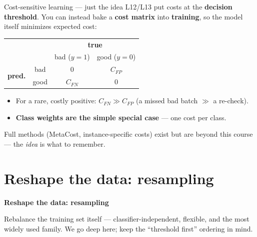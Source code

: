 \documentclass[aspectratio=169]{beamer}
\begin{document}
\begin{frame}{Cost-sensitive learning --- just the idea}
  L12/L13 put costs at the \textbf{decision threshold}. You can instead bake a \textbf{cost matrix}
  into \textbf{training}, so the model itself minimizes expected cost:
  \begin{center}\small
    \renewcommand{\arraystretch}{1.2}
    \begin{tabular}{cc|cc}
      & & \multicolumn{2}{c}{\textbf{true}} \\
      & & bad ($y{=}1$) & good ($y{=}0$) \\
      \hline
      \multirow{2}{*}{\textbf{pred.}} & bad & $0$ & $C_{FP}$ \\
      & good & $C_{FN}$ & $0$ \\
    \end{tabular}
  \end{center}
  \begin{itemize}\small
    \item For a rare, costly positive: $C_{FN} \gg C_{FP}$ (a missed bad batch $\gg$ a re-check).
    \item \textbf{Class weights are the simple special case} --- one cost per class.
  \end{itemize}
  \vfill
  \footnotesize Full methods (MetaCost, instance-specific costs) exist but are beyond this course --- the \emph{idea} is what to remember.
\end{frame}

\section{Reshape the data: resampling}

\begin{frame}[plain]
  \vfill
  \begin{center}
    {\Large\color{popblue}\textbf{Reshape the data: resampling}}\\[0.9em]
    \begin{minipage}{0.82\textwidth}\centering\small
      Rebalance the training set itself --- classifier-independent, flexible, and the most
      widely used family. We go deep here; keep the ``threshold first'' ordering in mind.
    \end{minipage}
  \end{center}
  \vfill
\end{frame}
\end{document}
